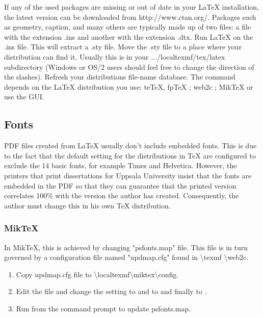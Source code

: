 If any of the used packages are missing or out of date in your \LaTeX{} installation, the latest version can be downloaded from http://www.ctan.org/. Packages such as geometry, caption, and many others are typically made
up of two files: a file with the extension .ins and another with the extension .dtx. Run \LaTeX{} on the .ins file.
This will extract a .sty file. Move the .sty file to a place where your distribution can find it. Usually this is in your .../localtexmf/tex/latex subdirectory (Windows or OS/2 users should feel free to change the direction of the slashes). Refresh your distributions file-name database. The command depends on the \LaTeX{} distribution you use: te\TeX{}, fp\TeX{} ; web2c ; Mik\TeX{}  or use the GUI.
 
\subsection{Fonts}
PDF files created from \LaTeX{} usually don't include embedded fonts. This is due to the fact that the default setting for the distributions in TeX are configured to exclude the 14 basic fonts, for example Times and Helvetica. However, the printers that print dissertations for Uppsala University insist that the fonts are embedded in the PDF so that they can guarantee that the printed version correlates 100\% with the version the author has created. Consequently, the author must change this in his own \TeX{} distribution.

\subsubsection{Mik\TeX{}}
In Mik\TeX{}, this is achieved by changing "psfonts.map" file. This file is in turn governed by a configuration file named "updmap.cfg" found in \textbackslash texmf \textbackslash web2c. 
\begin{enumerate}
	\item Copy updmap.cfg file to \textbackslash localtexmf\textbackslash miktex\textbackslash config.
	\item \raggedright Edit the file and change the setting  to  and  to  and finally  to .
	\item Run  from the command prompt to update psfonts.map.
\end{enumerate}

